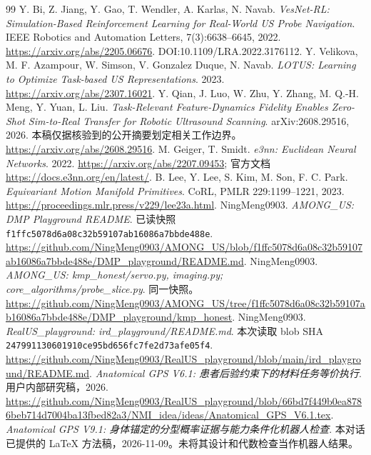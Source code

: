 \documentclass[UTF8,fontset=fandol,11pt,a4paper]{ctexart}
\theoremstyle{plain}
\theoremstyle{definition}
\theoremstyle{remark}
\numberwithin{equation}{section}
\newcommand{\code}[1]{\begingroup\small\nolinkurl{#1}\endgroup}
\begin{document}
\begin{thebibliography}{99}
 Y. Bi, Z. Jiang, Y. Gao, T. Wendler, A. Karlas, N. Navab. \emph{VesNet-RL: Simulation-Based Reinforcement Learning for Real-World US Probe Navigation}. IEEE Robotics and Automation Letters, 7(3):6638--6645, 2022. \url{https://arxiv.org/abs/2205.06676}. DOI:10.1109/LRA.2022.3176112.
 Y. Velikova, M. F. Azampour, W. Simson, V. Gonzalez Duque, N. Navab. \emph{LOTUS: Learning to Optimize Task-based US Representations}. 2023. \url{https://arxiv.org/abs/2307.16021}.
 Y. Qian, J. Luo, W. Zhu, Y. Zhang, M. Q.-H. Meng, Y. Yuan, L. Liu. \emph{Task-Relevant Feature-Dynamics Fidelity Enables Zero-Shot Sim-to-Real Transfer for Robotic Ultrasound Scanning}. arXiv:2608.29516, 2026. 本稿仅据核验到的公开摘要划定相关工作边界。\url{https://arxiv.org/abs/2608.29516}.
 M. Geiger, T. Smidt. \emph{e3nn: Euclidean Neural Networks}. 2022. \url{https://arxiv.org/abs/2207.09453}; 官方文档 \url{https://docs.e3nn.org/en/latest/}.
 B. Lee, Y. Lee, S. Kim, M. Son, F. C. Park. \emph{Equivariant Motion Manifold Primitives}. CoRL, PMLR 229:1199--1221, 2023. \url{https://proceedings.mlr.press/v229/lee23a.html}.
 NingMeng0903. \emph{AMONG\_US: DMP Playground README}. 已读快照 \code{f1ffc5078d6a08c32b59107ab16086a7bbde488e}. \url{https://github.com/NingMeng0903/AMONG_US/blob/f1ffc5078d6a08c32b59107ab16086a7bbde488e/DMP_playground/README.md}.
 NingMeng0903. \emph{AMONG\_US: kmp\_honest/servo.py, imaging.py; core\_algorithms/probe\_slice.py}. 同一快照。\url{https://github.com/NingMeng0903/AMONG_US/tree/f1ffc5078d6a08c32b59107ab16086a7bbde488e/DMP_playground/kmp_honest}.
 NingMeng0903. \emph{RealUS\_playground: ird\_playground/README.md}. 本次读取 blob SHA \code{247991130601910ce95bd656fc7fe2d73afe05f4}. \url{https://github.com/NingMeng0903/RealUS_playground/blob/main/ird_playground/README.md}.
 \emph{Anatomical GPS V6.1: 患者后验约束下的材料任务等价执行}. 用户内部研究稿，2026. \url{https://github.com/NingMeng0903/RealUS_playground/blob/66bd7f449b0ea8786beb714d7004ba13fbed82a3/NMI_idea/ideas/Anatomical_GPS_V6.1.tex}.
 \emph{Anatomical GPS V9.1: 身体锚定的分型概率证据与能力条件化机器人检查}. 本对话已提供的 LaTeX 方法稿，2026-11-09。未将其设计和代数检查当作机器人结果。
\end{thebibliography}
\end{document}
